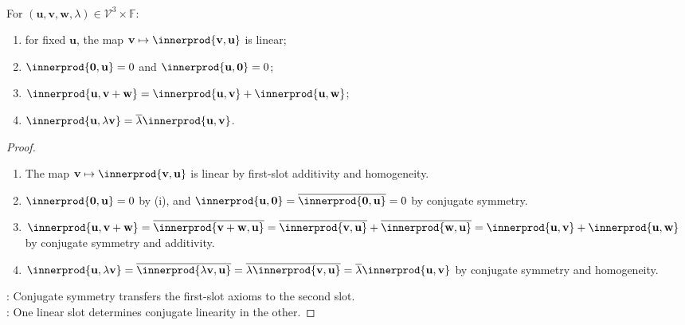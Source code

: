 \begin{proposition} \label{prop:basic-inner-product-identities} \\
For $(\mathbf{u},\mathbf{v},\mathbf{w},\lambda)\in\mathcal{V}^3\times\mathbb{F}$:
\begin{enumerate}[label=(\roman*)]
\setlength{\itemsep}{0pt}
\item for fixed $\mathbf{u}$, the map $\mathbf{v}\mapsto \innerprod{\mathbf{v},\mathbf{u}}$ is linear;
\item $\innerprod{\mathbf{0},\mathbf{u}}=0$ and $\innerprod{\mathbf{u},\mathbf{0}}=0$;
\item $\innerprod{\mathbf{u},\mathbf{v}+\mathbf{w}}=\innerprod{\mathbf{u},\mathbf{v}}+\innerprod{\mathbf{u},\mathbf{w}}$;
\item $\innerprod{\mathbf{u},\lambda\mathbf{v}}=\overline{\lambda}\innerprod{\mathbf{u},\mathbf{v}}$.
\end{enumerate}
\begin{proof}
\begin{enumerate}[label=(\roman*)]
\setlength{\itemsep}{0pt}
\item The map $\mathbf{v}\mapsto\innerprod{\mathbf{v},\mathbf{u}}$ is linear by first-slot additivity and homogeneity.
\item $\innerprod{\mathbf{0},\mathbf{u}}=0$ by (i), and $\innerprod{\mathbf{u},\mathbf{0}}=\overline{\innerprod{\mathbf{0},\mathbf{u}}}=0$ by conjugate symmetry.
\item $\innerprod{\mathbf{u},\mathbf{v}+\mathbf{w}}=\overline{\innerprod{\mathbf{v}+\mathbf{w},\mathbf{u}}}=\overline{\innerprod{\mathbf{v},\mathbf{u}}}+\overline{\innerprod{\mathbf{w},\mathbf{u}}}=\innerprod{\mathbf{u},\mathbf{v}}+\innerprod{\mathbf{u},\mathbf{w}}$ by conjugate symmetry and additivity.
\item $\innerprod{\mathbf{u},\lambda\mathbf{v}}=\overline{\innerprod{\lambda\mathbf{v},\mathbf{u}}}=\overline{\lambda\innerprod{\mathbf{v},\mathbf{u}}}=\overline{\lambda}\innerprod{\mathbf{u},\mathbf{v}}$ by conjugate symmetry and homogeneity.
\end{enumerate}
: Conjugate symmetry transfers the first-slot axioms to the second slot.\\
: One linear slot determines conjugate linearity in the other.
\end{proof}
\end{proposition}

